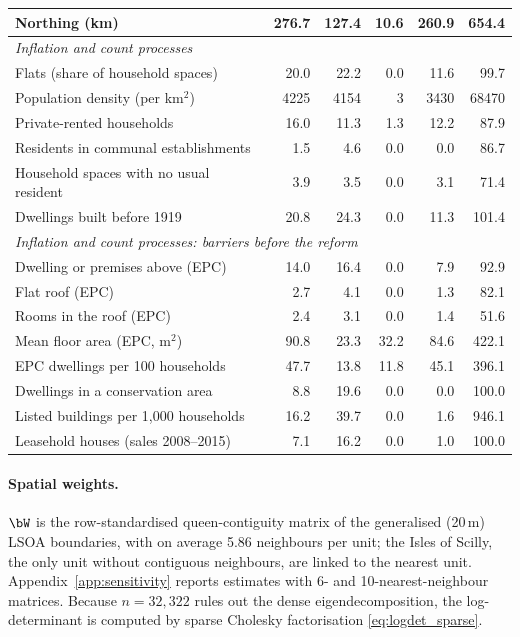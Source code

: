 \begin{table}[htbp]
\begin{tabular}{lrrrrr}
\quad Northing (km) & 276.7 & 127.4 & 10.6 & 260.9 & 654.4 \\
\midrule
\multicolumn{6}{l}{\textit{Inflation and count processes}} \\
\quad Flats (share of household spaces) & 20.0 & 22.2 & 0.0 & 11.6 & 99.7 \\
\quad Population density (per km$^2$) & 4225 & 4154 & 3 & 3430 & 68470 \\
\quad Private-rented households & 16.0 & 11.3 & 1.3 & 12.2 & 87.9 \\
\quad Residents in communal establishments & 1.5 & 4.6 & 0.0 & 0.0 & 86.7 \\
\quad Household spaces with no usual resident & 3.9 & 3.5 & 0.0 & 3.1 & 71.4 \\
\quad Dwellings built before 1919 & 20.8 & 24.3 & 0.0 & 11.3 & 101.4 \\
\multicolumn{6}{l}{\textit{Inflation and count processes: barriers before the reform}} \\
\quad Dwelling or premises above (EPC) & 14.0 & 16.4 & 0.0 & 7.9 & 92.9 \\
\quad Flat roof (EPC) & 2.7 & 4.1 & 0.0 & 1.3 & 82.1 \\
\quad Rooms in the roof (EPC) & 2.4 & 3.1 & 0.0 & 1.4 & 51.6 \\
\quad Mean floor area (EPC, m$^2$) & 90.8 & 23.3 & 32.2 & 84.6 & 422.1 \\
\quad EPC dwellings per 100 households & 47.7 & 13.8 & 11.8 & 45.1 & 396.1 \\
\quad Dwellings in a conservation area & 8.8 & 19.6 & 0.0 & 0.0 & 100.0 \\
\quad Listed buildings per 1{,}000 households & 16.2 & 39.7 & 0.0 & 1.6 & 946.1 \\
\quad Leasehold houses (sales 2008--2015) & 7.1 & 16.2 & 0.0 & 1.0 & 100.0 \\
\bottomrule
\end{tabular}
\end{table}

\paragraph{Spatial weights.}
$\bW$ is the row-standardised queen-contiguity matrix of the generalised (20\,m) LSOA boundaries, with on average 5.86 neighbours per unit; the Isles of Scilly, the only unit without contiguous neighbours, are linked to the nearest unit.
Appendix~\ref{app:sensitivity} reports estimates with 6- and 10-nearest-neighbour matrices.
Because $n = 32{,}322$ rules out the dense eigendecomposition, the log-determinant is computed by sparse Cholesky factorisation \eqref{eq:logdet_sparse}.

